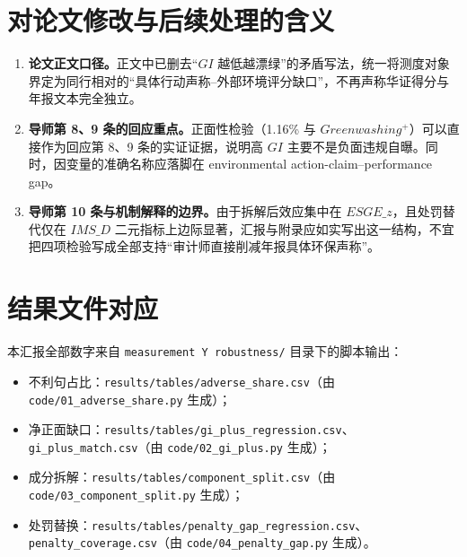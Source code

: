 \documentclass[12pt,a4paper]{article}
\begin{document}
\begin{table}[htbp]
\centering
\caption{四项测度稳健性标准对照}
\label{tab:summary_check}
\end{table}

\section{对论文修改与后续处理的含义}

\begin{enumerate}
\item \textbf{论文正文口径。}正文中已删去``$GI$ 越低越漂绿''的矛盾写法，统一将测度对象界定为同行相对的``具体行动声称--外部环境评分缺口''，不再声称华证得分与年报文本完全独立。
\item \textbf{导师第 8、9 条的回应重点。}正面性检验（1.16\% 与 $Greenwashing^+$）可以直接作为回应第 8、9 条的实证证据，说明高 $GI$ 主要不是负面违规自曝。同时，因变量的准确名称应落脚在 environmental action-claim--performance gap。
\item \textbf{导师第 10 条与机制解释的边界。}由于拆解后效应集中在 $ESGE\_z$，且处罚替代仅在 $IMS\_D$ 二元指标上边际显著，汇报与附录应如实写出这一结构，不宜把四项检验写成全部支持``审计师直接削减年报具体环保声称''。
\end{enumerate}

\section*{结果文件对应}

本汇报全部数字来自 \texttt{measurement Y robustness/} 目录下的脚本输出：
\begin{itemize}
\item 不利句占比：\texttt{results/tables/adverse\_share.csv}（由 \texttt{code/01\_adverse\_share.py} 生成）；
\item 净正面缺口：\texttt{results/tables/gi\_plus\_regression.csv}、\texttt{gi\_plus\_match.csv}（由 \texttt{code/02\_gi\_plus.py} 生成）；
\item 成分拆解：\texttt{results/tables/component\_split.csv}（由 \texttt{code/03\_component\_split.py} 生成）；
\item 处罚替换：\texttt{results/tables/penalty\_gap\_regression.csv}、\texttt{penalty\_coverage.csv}（由 \texttt{code/04\_penalty\_gap.py} 生成）。
\end{itemize}
\end{document}
